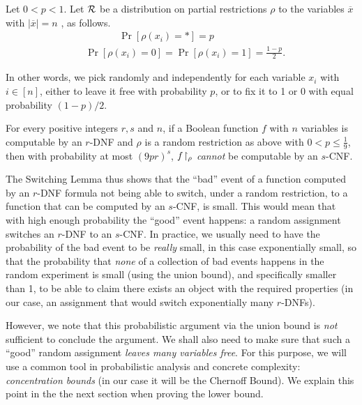 \begin{tcolorbox}[colframe=white, colback=green!6, boxrule=0mm, sharp corners]
\begin{definition}\label{def:random-rest}
 Let $0< p<1$.
Let $\mathcal{R}$ be a distribution on partial restrictions $\rho$ to the variables $\overline{x}$ with $|\overline{x}|=n$ , as follows.
$$
\begin{aligned}
& ~~~~~~~~~~~ \quad \operatorname{Pr}\left[\rho\left(x_i\right)=*\right]=p \\
& \operatorname{Pr}\left[\rho\left(x_i\right)=0\right]=\operatorname{Pr}\left[\rho\left(x_i\right)=1\right]=\frac{1-p}{2}.
\end{aligned}
$$
\end{definition}
\end{tcolorbox}
In other words, we pick randomly and independently for each variable $x_i$ with $i\in[n]$, either to leave it free with probability $p$, or to fix it to 1 or 0 with equal probability $(1-p)/2$.


\begin{tcolorbox}[colframe=white, colback=blue!5, boxrule=0mm, sharp corners]
\begin{theorem}\label{thm:Switching-Lemma}
For every positive integers $r,s$ and $n$, if a Boolean function $f$ with $n$ variables is computable by an $r$-DNF and $\rho$ is a random restriction as above with $0<p \leq \frac{1}{9}$, then with probability at most $(9pr)^s$, $f\!\upharpoonright_\rho$ \emph{cannot} be computable by  an $s$-CNF.
\end{theorem}
\end{tcolorbox}

The Switching Lemma thus shows that the ``bad'' event of a function computed by an $r$-DNF formula not being able to switch, under  a random restriction,  to a function that can be computed by an $s$-CNF, is small. This would mean that with high enough probability the ``good'' event happens: a random assignment switches an $r$-DNF to an $s$-CNF.
In practice, we usually need to have the probability of the bad event to be \emph{really} small, in this case  exponentially small, so that the probability that \emph{none} of a collection of bad events happens in the random experiment is small (using the union bound), and specifically smaller than 1, to be able to claim there exists an object with the required properties (in our case, an assignment that would switch exponentially many $r$-DNFs).  

However, we note that this probabilistic argument via the union bound  is  \emph{not} sufficient to conclude the argument. We shall also need to make sure that such a ``good'' random assignment  \emph{leaves many variables free}. For this purpose, we will use a common tool in probabilistic analysis and concrete complexity: \emph{concentration bounds} (in our case it will be the Chernoff Bound). We  explain this point in the the next section when proving the lower bound.


